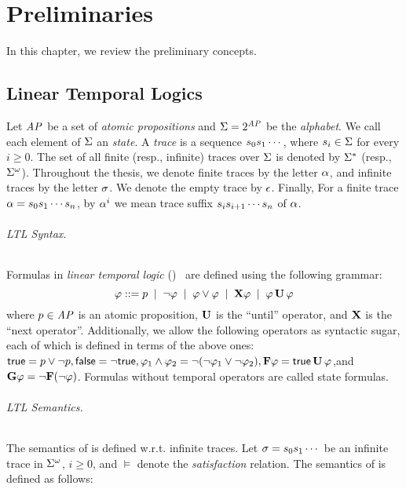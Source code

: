 \chapter{Preliminaries}
\label{chap:Preliminaries}

In this chapter, we review the preliminary concepts.

\section{Linear Temporal Logics}
\label{sec:pre}

Let $\mathit{AP}$ be a set of {\em atomic propositions} and $\Sigma = 2^{\mathit{AP}}$ be the 
{\em alphabet}. We call each element of $\Sigma$ an {\em state}. A {\em 
trace} is a sequence $ s_0s_1\cdots$, where  $s_i\in \Sigma$ 
for every $i\geq 0$. The set of all finite (resp., infinite) traces over 
$\Sigma$ is denoted by $\Sigma^*$ (resp., $\Sigma^\omega$). Throughout 
the thesis, we denote finite traces by the letter $\alpha$, and infinite 
traces by the  letter $\sigma$. We denote the empty trace by $\epsilon$. 
Finally, For a finite trace $\alpha = s_0s_1\cdots s_n$, by 
$\alpha^i$ we mean trace suffix $s_is_{i+1}\cdots s_n$ of 
$\alpha$.

\subparagraph{LTL Syntax.} Formulas in {\em linear temporal logic} 
(\LTL)~\cite{mp79} are defined using the following grammar:
$$\varphi ::=  p \; \mid \; \neg\varphi \; \mid \; \varphi\vee\varphi \; \mid 
\; \mathbf{X}\varphi \; \mid \; \varphi \, \mathbf{U} \, \varphi$$
where $p   \in \mathit{AP}$ is an atomic proposition, $\mathbf{U}$ is the ``until'' operator, 
and $\mathbf{X}$ is the ``next operator''. Additionally, we allow the following 
operators as syntactic sugar, each of which is defined in terms of the above 
ones: $ \mathsf{true} = p \vee  \neg p, \mathsf{false} = \neg \mathsf{true}, \varphi_1 \wedge \varphi_2  = 
\neg (\neg \varphi_1 \vee \neg \varphi_2), \textbf{F} \varphi = \mathsf{true} 
\, \textbf{U} \, \varphi $,and $\textbf{G} \varphi  = \neg \mathbf{F} (\neg \varphi)$. 
Formulas without temporal operators are called state formulas.

\subparagraph{LTL Semantics.}  The semantics of \LTL is defined w.r.t. infinite 
traces. Let $\sigma = s_0s_1\cdots$ be an infinite trace in 
$\Sigma^\omega$, $i \geq 0$, and $\models$ denote the {\em satisfaction} 
relation. The semantics of 
\LTL is defined as follows:

